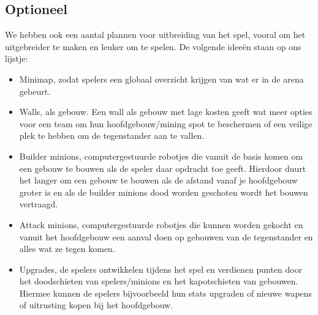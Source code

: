 \subsection{Optioneel}
We hebben ook een aantal plannen voor uitbreiding van het spel, vooral om het uitgebreider te maken en leuker om te spelen. De volgende idee\"en staan op ons lijstje:
\begin{itemize}
  \item Minimap, zodat spelers een globaal overzicht krijgen van wat er in de arena gebeurt.
  \item Walls, als gebouw. Een wall als gebouw met lage kosten geeft wat meer opties voor een team om hun hoofdgebouw/mining spot te beschermen of een veilige plek te hebben om de tegenstander aan te vallen.
  \item Builder minions, computergestuurde robotjes die vanuit de basis komen om een gebouw te bouwen als de speler daar opdracht toe geeft. Hierdoor
duurt het langer om een gebouw te bouwen als de afstand vanaf je hoofdgebouw groter is en als de builder minions dood worden geschoten wordt het bouwen vertraagd.
  \item Attack minions, computergestuurde robotjes die kunnen worden gekocht en vanuit het hoofdgebouw een aanval doen op gebouwen van de tegenstander en alles wat ze tegen komen.
  \item Upgrades, de spelers ontwikkelen tijdens het spel en verdienen punten door het doodschieten van spelers/minions en het kapotschieten van gebouwen. Hiermee kunnen de spelers bijvoorbeeld hun stats upgraden of nieuwe wapens of uitrusting kopen bij het hoofdgebouw.
\end{itemize}